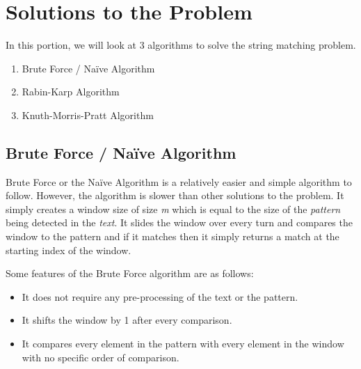 \documentclass[a4paper, 12pt]{report}
\begin{document}

    \chapter{Solutions to the Problem}
    
    In this portion, we will look at 3 algorithms to solve the string matching problem.
    \begin{enumerate}
        \item Brute Force / Na\"ive Algorithm
        \item Rabin-Karp Algorithm
        \item Knuth-Morris-Pratt Algorithm
    \end{enumerate}
    \section{Brute Force / Na\"ive Algorithm}

    Brute Force or the Na\"ive Algorithm is a relatively easier and simple algorithm to follow. However, the algorithm is slower than other solutions to the problem. It simply creates a window size of size \textit{m} which is equal to the size of the \textit{pattern} being detected in the \textit{text}. It slides the window over every turn and compares the window to the pattern and if it matches then it simply returns a match at the starting index of the window.
    
    Some features of the Brute Force algorithm are as follows:
    \begin{itemize}
        \item It does not require any pre-processing of the text or the pattern.
        \item It shifts the window by 1 after every comparison.
        \item It compares every element in the pattern with every element in the window with no specific order of comparison.
    \end{itemize}
\end{document}
